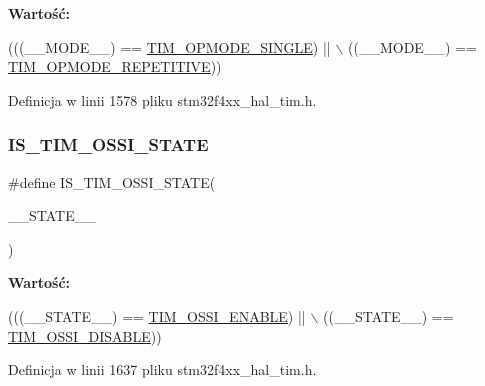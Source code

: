 {\bfseries Wartość\+:}
\begin{DoxyCode}
(((\_\_MODE\_\_) == \hyperlink{group___t_i_m___one___pulse___mode_gab0447b341024e86145c7ce0dc2931fc6}{TIM\_OPMODE\_SINGLE}) || \(\backslash\)
                                            ((\_\_MODE\_\_) == \hyperlink{group___t_i_m___one___pulse___mode_ga14a7b6f95769c5b430f65189d9c7cfa3}{TIM\_OPMODE\_REPETITIVE}))
\end{DoxyCode}


Definicja w linii 1578 pliku stm32f4xx\+\_\+hal\+\_\+tim.\+h.

\mbox{\label{group___t_i_m___private___macros_gaf5097557634d53d3f9438cf222e2192b}} 
\subsubsection{\texorpdfstring{I\+S\+\_\+\+T\+I\+M\+\_\+\+O\+S\+S\+I\+\_\+\+S\+T\+A\+TE}{IS\_TIM\_OSSI\_STATE}}
{\footnotesize\ttfamily \#define I\+S\+\_\+\+T\+I\+M\+\_\+\+O\+S\+S\+I\+\_\+\+S\+T\+A\+TE(\begin{DoxyParamCaption}\item[{}]{\+\_\+\+\_\+\+S\+T\+A\+T\+E\+\_\+\+\_\+ }\end{DoxyParamCaption})}

{\bfseries Wartość\+:}
\begin{DoxyCode}
(((\_\_STATE\_\_) == \hyperlink{group___t_i_m___o_s_s_i___off___state___selection__for___idle__mode__state_gae5b5901b177cd054cd5503630892680f}{TIM\_OSSI\_ENABLE}) || \(\backslash\)
                                            ((\_\_STATE\_\_) == \hyperlink{group___t_i_m___o_s_s_i___off___state___selection__for___idle__mode__state_gab1a20c65a3d24ef770f8a2a14c24130b}{TIM\_OSSI\_DISABLE}))
\end{DoxyCode}


Definicja w linii 1637 pliku stm32f4xx\+\_\+hal\+\_\+tim.\+h.

\mbox{\label{group___t_i_m___private___macros_ga9781b1128c61785dd818f64d83f4cb77}} 

